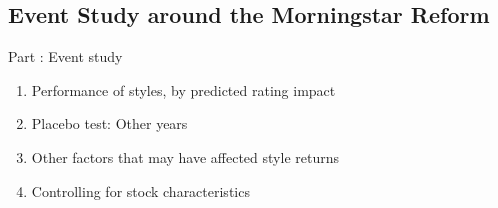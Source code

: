 \documentclass[UTF8, 16pt]{beamer}
\begin{document}
\begin{CJK*}{UTF8}{gbsn}
\subsection{Event Study around the Morningstar Reform}

\begin{frame}{Part \uppercase\expandafter{}: Event study}
	\begin{enumerate}
		\item Performance of styles, by predicted rating impact
		\item Placebo test: Other years
		\item Other factors that may have affected style returns
		\item Controlling for stock characteristics
	\end{enumerate}
\end{frame}


\end{CJK*}
\end{document}
